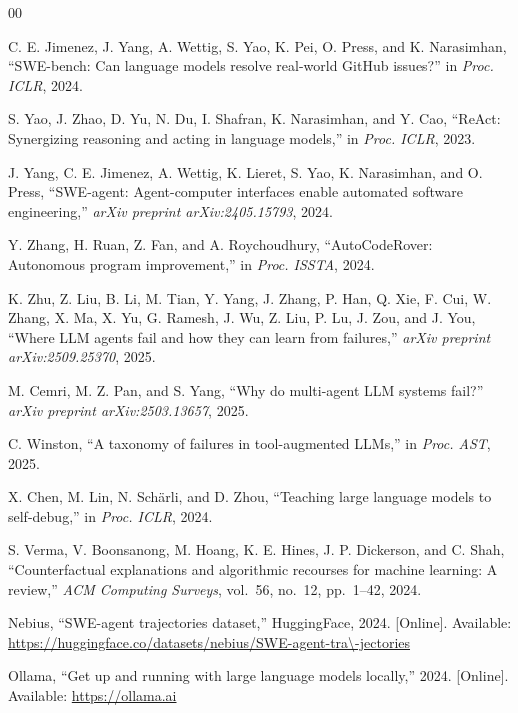 \documentclass{ieeeaccess}
\begin{document}
\begin{thebibliography}{00}
\normalsize

 C. E. Jimenez, J. Yang, A. Wettig, S. Yao, K. Pei, O. Press, and K. Narasimhan, ``SWE-bench: Can language models resolve real-world GitHub issues?'' in \textit{Proc. ICLR}, 2024.

 S. Yao, J. Zhao, D. Yu, N. Du, I. Shafran, K. Narasimhan, and Y. Cao, ``ReAct: Synergizing reasoning and acting in language models,'' in \textit{Proc. ICLR}, 2023.

 J. Yang, C. E. Jimenez, A. Wettig, K. Lieret, S. Yao, K. Narasimhan, and O. Press, ``SWE-agent: Agent-computer interfaces enable automated software engineering,'' \textit{arXiv preprint arXiv:2405.15793}, 2024.

 Y. Zhang, H. Ruan, Z. Fan, and A. Roychoudhury, ``AutoCodeRover: Autonomous program improvement,'' in \textit{Proc. ISSTA}, 2024.

 K. Zhu, Z. Liu, B. Li, M. Tian, Y. Yang, J. Zhang, P. Han, Q. Xie, F. Cui, W. Zhang, X. Ma, X. Yu, G. Ramesh, J. Wu, Z. Liu, P. Lu, J. Zou, and J. You, ``Where LLM agents fail and how they can learn from failures,'' \textit{arXiv preprint arXiv:2509.25370}, 2025.

 M. Cemri, M. Z. Pan, and S. Yang, ``Why do multi-agent LLM systems fail?'' \textit{arXiv preprint arXiv:2503.13657}, 2025.

 C. Winston, ``A taxonomy of failures in tool-augmented LLMs,'' in \textit{Proc. AST}, 2025.

 X. Chen, M. Lin, N. Sch\"{a}rli, and D. Zhou, ``Teaching large language models to self-debug,'' in \textit{Proc. ICLR}, 2024.

 S. Verma, V. Boonsanong, M. Hoang, K. E. Hines, J. P. Dickerson, and C. Shah, ``Counterfactual explanations and algorithmic recourses for machine learning: A review,'' \textit{ACM Computing Surveys}, vol.~56, no.~12, pp.~1--42, 2024.

 Nebius, ``SWE-agent trajectories dataset,'' HuggingFace, 2024. [Online]. Available: \url{https://huggingface.co/datasets/nebius/SWE-agent-tra\-jectories}

 Ollama, ``Get up and running with large language models locally,'' 2024. [Online]. Available: \url{https://ollama.ai}


\end{thebibliography}
\end{document}
